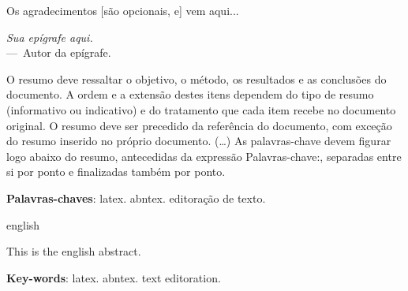 \documentclass[
	12pt,				%
	openright,			%
	oneside,			%
	a4paper,			%
	english,			%
	brazil				%
	]{abntex2}
\begin{document}
\begin{folhadeaprovacao}

\end{folhadeaprovacao}

\begin{agradecimentos}
\noindent Os agradecimentos [são opcionais, e] vem aqui...
\end{agradecimentos}

\begin{epigrafe}
    \vspace*{\fill}
{\textsl{Sua epígrafe aqui.}}\\{---~Autor da epígrafe.}
\end{epigrafe}

	\setlength{\absparsep}{18pt} %
	\begin{resumo}
	 \noindent O resumo deve ressaltar o objetivo, o método, os resultados e as conclusões do documento. A ordem e a extensão
	 destes itens dependem do tipo de resumo (informativo ou indicativo) e do tratamento que cada item recebe no documento original. O resumo deve ser precedido da referência do documento, com exceção do resumo inserido no
	 próprio documento. (\ldots) As palavras-chave devem figurar logo abaixo do resumo, antecedidas da expressão Palavras-chave:, separadas entre si por
	 ponto e finalizadas também por ponto.
	
	 \textbf{Palavras-chaves}: latex. abntex. editoração de texto.
	\end{resumo}

\begin{resumo}[Abstract]
	 \begin{otherlanguage*}{english}
	
	\noindent This is the english abstract.
	
	   \vspace{\onelineskip}
	
	   \noindent
	   \textbf{Key-words}: latex. abntex. text editoration.
	 \end{otherlanguage*}
\end{resumo}

\renewcommand{\listfigurename}{Lista de figuras} %
\pdfbookmark[0]{\listfigurename}{lof}
\listoffigures*
\cleardoublepage

\listoftables*
\cleardoublepage
\end{document}
